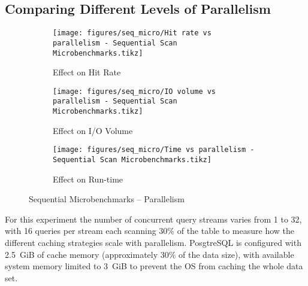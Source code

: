 


\subsection{Comparing Different Levels of Parallelism}
\label{sec:experiment_micro_parallelism}


\begin{figure}[p]
\centering
\begin{subfigure}{0.45\textwidth}
    \centering
    \texttt{[image: figures/seq\_micro/Hit rate vs parallelism - Sequential Scan Microbenchmarks.tikz]}
    \caption{Effect on Hit Rate}
    \label{fig:seq_micro_parallel_hitrate}
\end{subfigure}\hspace{0.05\textwidth}%
\begin{subfigure}{0.45\textwidth}
    \centering
    \texttt{[image: figures/seq\_micro/IO volume vs parallelism - Sequential Scan Microbenchmarks.tikz]}
    \caption{Effect on I/O Volume}
    \label{fig:seq_micro_parallel_iovol}
\end{subfigure}

\vspace{20pt}
\begin{subfigure}{0.45\textwidth}
    \centering
    \texttt{[image: figures/seq\_micro/Time vs parallelism - Sequential Scan Microbenchmarks.tikz]}
    \caption{Effect on Run-time}
    \label{fig:seq_micro_parallel_time}
\end{subfigure}

\caption{Sequential Microbenchmarks -- Parallelism}
\label{fig:seq_micro_parallelism}
\end{figure}


For this experiment the number of concurrent query streams varies from 1 to 32, with 16 queries per stream each scanning 30\% of the table to measure how the different caching strategies scale with parallelism. PosgtreSQL is configured with 2.5~GiB of cache memory (approximately 30\% of the data size), with available system memory limited to 3~GiB to prevent the OS from caching the whole data set. %


